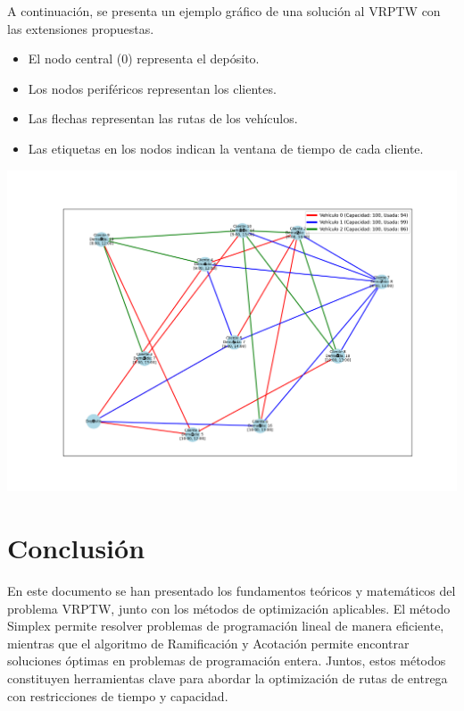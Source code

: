 \documentclass{article}
\begin{document}
A continuación, se presenta un ejemplo gráfico de una solución al VRPTW con las extensiones propuestas.

\begin{itemize}
    \item El nodo central (0) representa el depósito.
    \item Los nodos periféricos representan los clientes.
    \item Las flechas representan las rutas de los vehículos.
    \item Las etiquetas en los nodos indican la ventana de tiempo de cada cliente.
\end{itemize}

\begin{center}
\includegraphics[width=1.0\textwidth]{vrptw_large_graph_with_capacity.png}
\end{center}

\section{Conclusión}
En este documento se han presentado los fundamentos teóricos y matemáticos del problema VRPTW, junto con los métodos de optimización aplicables. El método Simplex permite resolver problemas de programación lineal de manera eficiente, mientras que el algoritmo de Ramificación y Acotación permite encontrar soluciones óptimas en problemas de programación entera. Juntos, estos métodos constituyen herramientas clave para abordar la optimización de rutas de entrega con restricciones de tiempo y capacidad.
\end{document}
